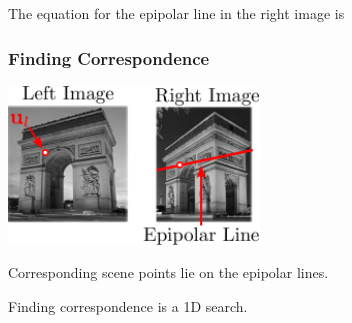 \begin{frame}
    The equation for the epipolar line in the right image is
\end{frame}

\begin{frame}
    \frametitle{Finding Correspondence}
    \centering

    \includegraphics[width=0.5\textwidth]{./images/epipolar_line_example_2.pdf}
    
    Corresponding scene points lie on the epipolar lines.

    Finding correspondence is a 1D search.
\end{frame}

